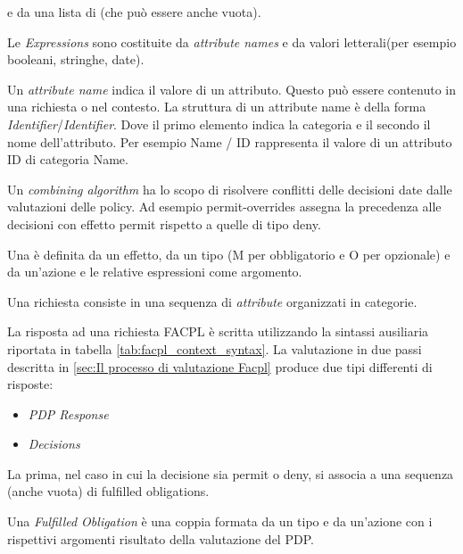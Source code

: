 e da una lista di \eObligations(che può essere anche vuota). \par
Le \emph{Expressions} sono costituite da \emph{attribute names} e da valori letterali(per esempio booleani, stringhe, date).\par
Un \emph{attribute name} indica il valore di un attributo. Questo può essere contenuto in una richiesta o nel contesto. La
struttura di un attribute name è della forma \emph{Identifier}/\emph{Identifier}. Dove il primo elemento indica la categoria
e il secondo il nome dell'attributo. Per esempio Name / ID rappresenta il valore di un attributo ID di categoria Name.\par
Un \emph{combining algorithm} ha lo scopo di risolvere conflitti delle decisioni date dalle valutazioni delle policy.
Ad esempio permit-overrides assegna la precedenza alle decisioni con effetto permit rispetto a quelle di tipo deny.\par
Una \eObligation è definita da un effetto, da un tipo (M per obbligatorio e O per opzionale) e da un'azione e le relative
espressioni come argomento.\par

Una richiesta consiste in una sequenza di \emph{attribute} organizzati in categorie.\par
La risposta ad una richiesta \ac{FACPL} è scritta utilizzando la sintassi ausiliaria riportata in tabella \ref{tab:facpl_context_syntax}.
La valutazione in due passi descritta in \ref{sec:Il processo di valutazione Facpl} produce due tipi differenti di risposte:
\begin{itemize}
  \renewcommand\labelitemi{--}
  \item \emph{\ac{PDP} Response}
  \item \emph{Decisions}
\end{itemize}
La prima, nel caso in cui la decisione sia permit o deny, si associa a una sequenza (anche vuota) di fulfilled obligations.\par
Una \emph{Fulfilled Obligation} è una coppia formata da un tipo e da un'azione con i rispettivi argomenti risultato della
valutazione del \ac{PDP}.


